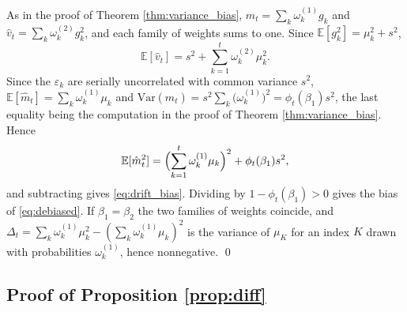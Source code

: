 \documentclass[pdflatex,sn-mathphys-num]{sn-jnl}%
\theoremstyle{thmstyleone}%
\theoremstyle{thmstyletwo}%
\theoremstyle{thmstylethree}%
\newcommand{\Var}{\mathrm{Var}}
\newcommand{\E}{\mathbb{E}}
\begin{document}
\begin{appendices}
As in the proof of Theorem \ref{thm:variance_bias}, $\hat m_t=\sum_k\omega^{(1)}_kg_k$ and $\hat v_t=\sum_k\omega^{(2)}_kg^2_k$, and each family of weights sums to one. Since $\E[g^2_k]=\mu^2_k+s^2$,
\begin{equation}
\E[\hat v_t]=s^2+\sum_{k=1}^{t}\omega^{(2)}_k\mu^2_k .
\end{equation}
Since the $\varepsilon_k$ are serially uncorrelated with common variance $s^2$, $\E[\hat m_t]=\sum_k\omega^{(1)}_k\mu_k$ and $\Var(\hat m_t)=s^2\sum_k\bigl(\omega^{(1)}_k\bigr)^2=\phi_t(\beta_1)s^2$, the last equality being the computation in the proof of Theorem \ref{thm:variance_bias}. Hence
\begin{equation}
\E[\hat m^2_t]=\Bigl(\sum_{k=1}^{t}\omega^{(1)}_k\mu_k\Bigr)^{2}+\phi_t(\beta_1)s^2 ,
\end{equation}
and subtracting gives \eqref{eq:drift_bias}. Dividing by $1-\phi_t(\beta_1)>0$ gives the bias of \eqref{eq:debiased}. If $\beta_1=\beta_2$ the two families of weights coincide, and $\Delta_t=\sum_k\omega^{(1)}_k\mu^2_k-(\sum_k\omega^{(1)}_k\mu_k)^2$ is the variance of $\mu_K$ for an index $K$ drawn with probabilities $\omega^{(1)}_k$, hence nonnegative. \qed

\subsection*{Proof of Proposition \ref{prop:diff}}


\end{appendices}
\end{document}
